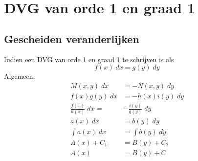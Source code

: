 \section{DVG van orde 1 en graad 1}
\subsection{Gescheiden veranderlijken}
Indien een DVG van orde 1 en graad 1 te schrijven is als
$$f(x)\;dx = g(y)\;dy$$
Algemeen:
\begin{equation*}
 \begin{split}
  M(x, y)\;dx & = -N(x, y)\; dy \\
  f(x)g(y)\;dx & = -h(x)i(y)\; dy \\
  \frac{f(x)}{h(x)}\; dx = & -\frac{i(y)}{g(y)}\;dy \\
  a(x) \; dx & = b(y)\; dy \\
  \int a(x) \; dx & = \int b(y) \; dy \\
  A(x) + C_1 & = B(y) + C_2 \\
  A(x) & = B(y) + C
 \end{split}
\end{equation*}
